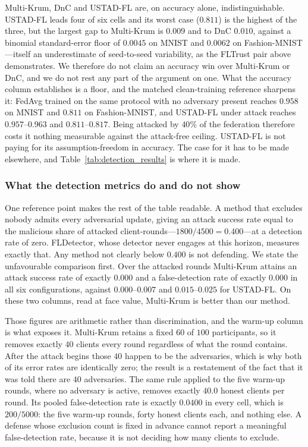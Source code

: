 \documentclass[journal]{IEEEtran}
\begin{document}
Multi-Krum, DnC and USTAD-FL are, on accuracy alone, indistinguishable. USTAD-FL leads four
of six cells and its worst case ($0.811$) is the highest of the three, but the largest gap
to Multi-Krum is $0.009$ and to DnC $0.010$, against a binomial standard-error floor of
$0.0045$ on MNIST and $0.0062$ on Fashion-MNIST---itself an underestimate of seed-to-seed
variability, as the FLTrust pair above demonstrates. We therefore do not claim an accuracy
win over Multi-Krum or DnC, and we do not rest any part of the argument on one. What the
accuracy column establishes is a floor, and the matched clean-training reference sharpens it:
FedAvg trained on the same protocol with no adversary present reaches $0.958$ on MNIST and
$0.811$ on Fashion-MNIST, and USTAD-FL under attack reaches $0.957$--$0.963$ and
$0.811$--$0.817$. Being attacked by $40\%$ of the federation therefore costs it nothing
measurable against the attack-free ceiling. USTAD-FL is not paying for its assumption-freedom
in accuracy. The case for it has to be made elsewhere, and Table~\ref{tab:detection_results} is
where it is made.

\subsubsection{What the detection metrics do and do not show}
One reference point makes the rest of the table readable. A method that excludes nobody admits every adversarial update, giving an attack success rate equal to the malicious share of attacked client-rounds---$1800/4500 = 0.400$---at a detection rate of zero. FLDetector, whose detector never engages at this horizon, measures exactly that. Any method not clearly below $0.400$ is not defending. We state the unfavourable comparison first. Over the attacked rounds Multi-Krum attains an
attack success rate of exactly $0.000$ and a false-detection rate of exactly $0.000$ in all
six configurations, against $0.000$--$0.007$ and $0.015$--$0.025$ for USTAD-FL. On these two
columns, read at face value, Multi-Krum is better than our method.

Those figures are arithmetic rather than discrimination, and the warm-up column is what
exposes it. Multi-Krum retains a fixed $60$ of $100$ participants, so it removes exactly $40$
clients every round regardless of what the round contains. After the attack begins those $40$
happen to be the adversaries, which is why both of its error rates are identically zero; the
result is a restatement of the fact that it was told there are $40$ adversaries. The same
rule applied to the five warm-up rounds, where no adversary is active, removes exactly $40.0$
honest clients per round. Its pooled false-detection rate is exactly $0.0400$ in every cell,
which is $200/5000$: the five warm-up rounds, forty honest clients each, and nothing else.
A defense whose exclusion count is fixed in advance cannot report a meaningful
false-detection rate, because it is not deciding how many clients to exclude.
\end{document}
